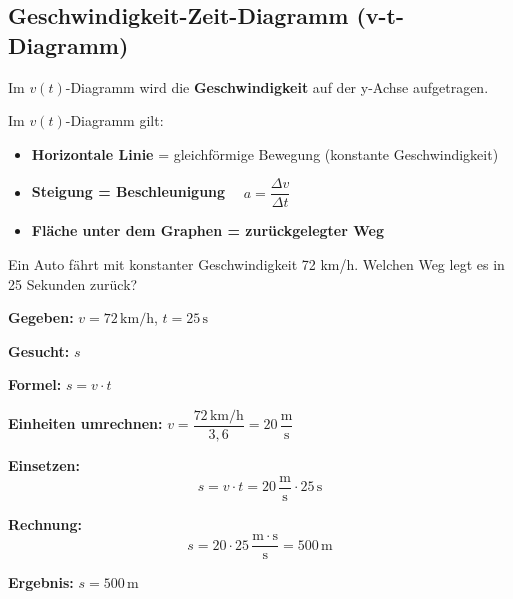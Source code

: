 \documentclass[11pt,a4paper]{article}
\begin{document}
\subsection{Geschwindigkeit-Zeit-Diagramm (v-t-Diagramm)}

Im $v(t)$-Diagramm wird die \textbf{Geschwindigkeit} auf der y-Achse aufgetragen.

\begin{center}
\end{center}

\begin{merksatz}
Im $v(t)$-Diagramm gilt:
\begin{itemize}
\item \textbf{Horizontale Linie} = gleichförmige Bewegung (konstante Geschwindigkeit)
\item \textbf{Steigung = Beschleunigung} $\quad a = \dfrac{\Delta v}{\Delta t}$
\item \textbf{Fläche unter dem Graphen = zurückgelegter Weg}
\end{itemize}
\end{merksatz}

\begin{beispiel}
Ein Auto fährt mit konstanter Geschwindigkeit 72 km/h. Welchen Weg legt es in 25 Sekunden zurück?

\textbf{Gegeben:} $v = 72\,\mathrm{km/h}$, \quad $t = 25\,\mathrm{s}$

\textbf{Gesucht:} $s$

\textbf{Formel:} $s = v \cdot t$

\textbf{Einheiten umrechnen:} $v = \dfrac{72\,\mathrm{km/h}}{3{,}6} = 20\,\dfrac{\mathrm{m}}{\mathrm{s}}$

\textbf{Einsetzen:}
\[
s = v \cdot t = 20\,\frac{\mathrm{m}}{\mathrm{s}} \cdot 25\,\mathrm{s}
\]

\textbf{Rechnung:}
\[
s = 20 \cdot 25\,\frac{\mathrm{m} \cdot \mathrm{s}}{\mathrm{s}} = 500\,\mathrm{m}
\]

\textbf{Ergebnis:} $\boxed{s = 500\,\mathrm{m}}$
\end{beispiel}
\end{document}
